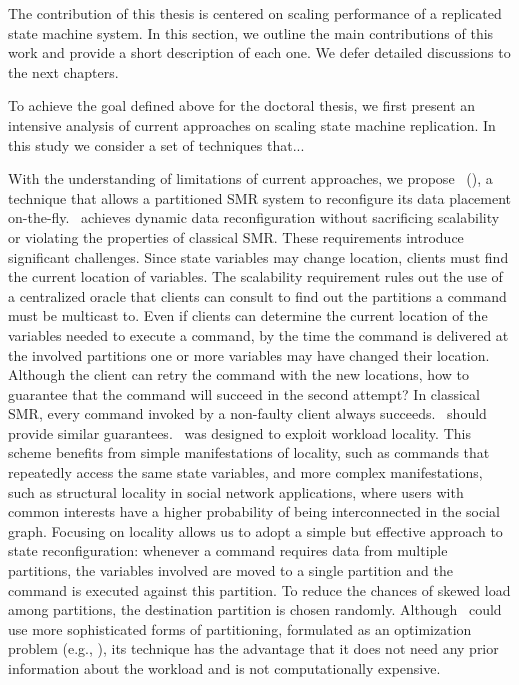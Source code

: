 The contribution of this thesis is centered on scaling performance of a
replicated state machine system. In this section, we outline the main
contributions of this work and provide a short description of each one. We defer
detailed discussions to the next chapters.

To achieve the goal defined above for the doctoral thesis, we first present an
intensive analysis of current approaches on scaling state machine replication.
In this study we consider a set of techniques that...

With the understanding of limitations of current approaches, we propose
\textbf{\dssmrlong}\ (\dssmr), a technique that allows a partitioned SMR system
to reconfigure its data placement on-the-fly. \dssmr\ achieves dynamic data
reconfiguration without sacrificing scalability or violating the properties of
classical SMR. These requirements introduce significant challenges. Since state
variables may change location, clients must find the current location of
variables. The scalability requirement rules out the use of a centralized oracle
that clients can consult to find out the partitions a command must be multicast
to. Even if clients can determine the current location of the variables needed
to execute a command, by the time the command is delivered at the involved
partitions one or more variables may have changed their location. Although the
client can retry the command with the new locations, how to guarantee that the
command will succeed in the second attempt? In classical SMR, every command
invoked by a non-faulty client always succeeds. \dssmr\ should provide similar
guarantees. \dssmr\ was designed to exploit workload locality. This scheme
benefits from simple manifestations of locality, such as commands that
repeatedly access the same state variables, and more complex manifestations,
such as structural locality in social network applications, where users with
common interests have a higher probability of being interconnected in the social
graph. Focusing on locality allows us to adopt a simple but effective approach
to state reconfiguration: whenever a command requires data from multiple
partitions, the variables involved are moved to a single partition and the
command is executed against this partition. To reduce the chances of skewed load
among partitions, the destination partition is chosen randomly. Although \dssmr\
could use more sophisticated forms of partitioning, formulated as an
optimization problem (e.g., \cite{curino2010sch,taft2014est}), its technique has
the advantage that it does not need any prior information about the workload and
is not computationally expensive.

